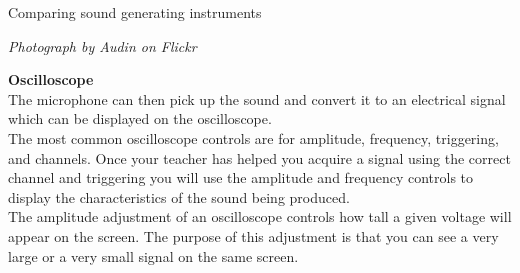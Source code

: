 \begin{activity}{Comparing sound generating instruments}
\begin{minipage}{.5\textwidth}
\begin{center}
\textsl{Photograph by Audin on Flickr}\\
\end{center}
\end{minipage}



\begin{minipage}{.5\textwidth}

\textbf{Oscilloscope} \\
The microphone can then pick up the sound and convert it to an electrical signal which can be displayed on the oscilloscope.\\
 
The most common oscilloscope controls are for amplitude, frequency, triggering, and channels. Once your teacher has helped you acquire a signal using the correct channel and triggering you will use the amplitude and frequency controls to display the characteristics of the sound being produced.\\
 
 	  The amplitude adjustment of an oscilloscope controls how tall a given voltage will appear on the screen. The purpose of this adjustment is that you can see a very large or a very small signal on the same screen. \\


\end{minipage}
\end{activity}
